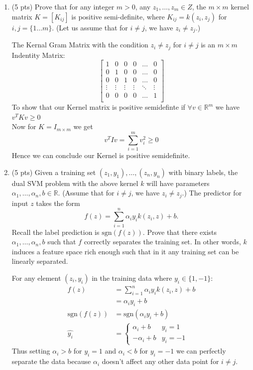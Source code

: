 \documentclass[a4paper]{article}
\theoremstyle{definition}
\newcommand{\sgn}{\mathrm{sgn}}
\def\R{\mathbb R}
\newenvironment{soln}{
    \leavevmode\color{blue}\ignorespaces
}{}
\begin{document}
\begin{enumerate}
\item (5 pts) Prove that for any integer $m>0$, any $z_1, \ldots, z_m \in Z$, the $m \times m$ kernel matrix $K=[K_{ij}]$ is positive semi-definite, where $K_{ij}=k(z_i, z_j)$ for $i,j=\{1\ldots m\}$. (Let us assume that for $i \neq j$, we have $z_i \neq z_j$.)

\begin{soln}
    The Kernal Gram Matrix with the condition $z_i\neq z_j$ for $i\neq j$ is an $m\times m$ Indentity Matrix:
    $$
        \begin{bmatrix}
            1 & 0 & 0 & 0 & \hdots & 0 \\
            0 & 1 & 0 & 0 & \hdots & 0 \\
            0 & 0 & 1 & 0 & \hdots & 0 \\
            \vdots & \vdots & \vdots & \vdots & \ddots & \vdots \\
            0 & 0 & 0 & 0 & \hdots & 1 \\
        \end{bmatrix}
    $$
    To show that our Kernel matrix is positive semidefinte if $\forall v \in \mathbb R^{m}$ we have $ v^TKv \geq 0$ \\
    Now for $K=I_{m \times m}$ we get
    $$
        v^TIv=\sum^m_{i=1}v_i^2 \geq 0
    $$
    Hence we can conclude our Kernel is positive semidefinite.
\end{soln}

\item (5 pts) Given a training set $(z_1, y_1), \ldots, (z_n, y_n)$ with binary labels, the dual SVM problem with the above kernel $k$ will have parameters $\alpha_1, \ldots, \alpha_n, b \in \R$.  (Assume that for $i \neq j$, we have $z_i \neq z_j$.) The predictor for input $z$ takes the form
$$f(z) = \sum_{i=1}^n \alpha_i y_i k(z_i, z) + b.$$
Recall the label prediction is $\sgn(f(z))$.
Prove that there exists $\alpha_1, \ldots, \alpha_n, b$ such that $f$ correctly separates the training set.
In other words, $k$ induces a feature space rich enough such that in it any training set can be linearly separated.

\begin{soln}
    For any element $(z_i,y_i)$ in the training data where $y_i \in \{1,-1\}$:
    \begin{align*}
        f(z) & = \sum_{i=1}^n \alpha_i y_i k(z_i, z) + b \\
        & = \alpha_i y_i +b \\
        \sgn(f(z)) & = \sgn(\alpha_i y_i +b) \\
        \hat{y_i} &= \left\{
                        \begin{array}{ll}
                            \alpha_i + b  & y_i = 1 \\
                            -\alpha_i + b & y_i = -1
                        \end{array}
                    \right.
    \end{align*}
    Thus setting $\alpha_i > b$ for $y_i=1$ and $\alpha_i < b$ for $y_i=-1$ we can perfectly separate the data because $\alpha_i$ doesn't affect any other data point for $i\neq j$.
\end{soln}


\end{enumerate}
\end{document}
